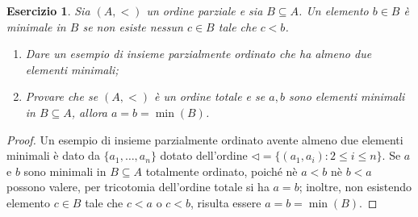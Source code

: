 \documentclass[fontsize = 11 pt, paper=A4, oneside, index=totoc, hyperref]{article}
\theoremstyle{definition}
\theoremstyle{plain}
\newtheorem{exe}{Esercizio}[section]
\begin{document}
\begin{exe}
  Sia \((A,<)\) un ordine parziale e sia \(B \subseteq A\). Un elemento \(b \in B\) è \emph{minimale} in \(B\) se non esiste nessun \(c \in B\) tale che \(c < b\).
  \begin{enumerate}
    \item Dare un esempio di insieme parzialmente ordinato che ha almeno due elementi minimali;
    \item Provare che se \((A,<)\) è un ordine totale e se \(a,b\) sono elementi minimali in \(B \subseteq A\), allora \(a = b = \min(B)\).
  \end{enumerate}
\end{exe}
\begin{proof}
  Un esempio di insieme parzialmente ordinato avente almeno due elementi minimali è dato da \(\lbrace a_1,\dots,a_n \rbrace\) dotato dell'ordine \(\lhd = \lbrace (a_1,a_i) \colon 2 \le i \le n \rbrace\). Se \(a\) e \(b\) sono minimali in \(B \subseteq A\) totalmente ordinato, poiché nè \(a < b\) nè \(b < a\) possono valere, per tricotomia dell'ordine totale si ha \(a = b\); inoltre, non esistendo elemento \(c \in B\) tale che \(c < a\) o \(c < b\), risulta essere \(a = b = \min(B)\).
\end{proof}
\end{document}

